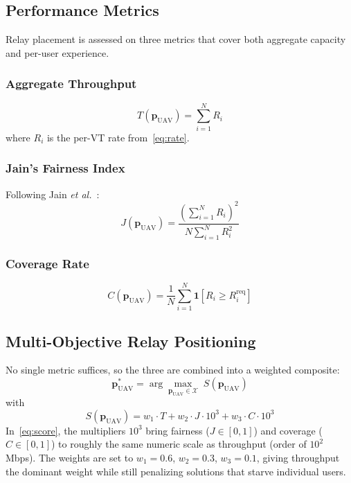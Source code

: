 \documentclass[journal]{IEEEtran}
\begin{document}
\subsection{Performance Metrics}

Relay placement is assessed on three metrics that cover both aggregate capacity and per-user experience.

\subsubsection{Aggregate Throughput}
\begin{equation}
    T(\mathbf{p}_\text{UAV}) = \sum_{i=1}^{N} R_i
\end{equation}
where $R_i$ is the per-VT rate from~\eqref{eq:rate}.

\subsubsection{Jain's Fairness Index}
Following Jain \textit{et al.}~\cite{jain1984}:
\begin{equation}
    J(\mathbf{p}_\text{UAV}) = \frac{\left(\sum_{i=1}^{N} R_i\right)^2}{N \sum_{i=1}^{N} R_i^2}
\end{equation}

\subsubsection{Coverage Rate}
\begin{equation}
    C(\mathbf{p}_\text{UAV}) = \frac{1}{N} \sum_{i=1}^{N} \mathbf{1}[R_i \geq R_i^\text{req}]
\end{equation}

\subsection{Multi-Objective Relay Positioning}

No single metric suffices, so the three are combined into a weighted composite:
\begin{equation}
    \mathbf{p}_\text{UAV}^* = \arg\max_{\mathbf{p}_\text{UAV} \in \mathcal{X}} \; S(\mathbf{p}_\text{UAV})
    \label{eq:objective}
\end{equation}
with
\begin{equation}
    S(\mathbf{p}_\text{UAV}) = w_1 \cdot T + w_2 \cdot J \cdot 10^3 + w_3 \cdot C \cdot 10^3
    \label{eq:score}
\end{equation}
In~\eqref{eq:score}, the multipliers $10^3$ bring fairness ($J \in [0,1]$) and coverage ($C \in [0,1]$) to roughly the same numeric scale as throughput (order of $10^2$\,Mbps). The weights are set to $w_1 = 0.6$, $w_2 = 0.3$, $w_3 = 0.1$, giving throughput the dominant weight while still penalizing solutions that starve individual users.
\end{document}
